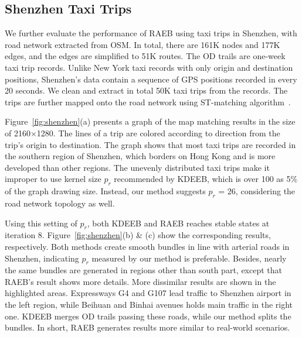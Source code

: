 \subsection{Shenzhen Taxi Trips}
\label{ssec:study3}

We further evaluate the performance of RAEB using taxi trips in Shenzhen, with road network extracted from OSM.
In total, there are 161K nodes and 177K edges, and the edges are simplified to 51K routes.
The OD trails are one-week taxi trip records.
Unlike New York taxi records with only origin and destination positions, Shenzhen's data contain a sequence of GPS positions recorded in every 20 seconds.
We clean and extract in total 50K taxi trips from the records.
The trips are further mapped onto the road network using ST-matching algorithm~\cite{lou_2009_map}.

Figure~\ref{fig:shenzhen}(a) presents a graph of the map matching results in the size of 2160$\times$1280.
The lines of a trip are colored according to direction from the trip's origin to destination.
The graph shows that most taxi trips are recorded in the southern region of Shenzhen, which borders on Hong Kong and is more developed than other regions.
The unevenly distributed taxi trips make it improper to use kernel size $p_r$ recommended by KDEEB, which is over 100 as 5\% of the graph drawing size.
Instead, our method suggests $p_r$ = 26, considering the road network topology as well.

Using this setting of $p_r$, both KDEEB and RAEB reaches stable states at iteration 8.
Figure~\ref{fig:shenzhen}(b) \& (c) show the corresponding results, respectively.
Both methods create smooth bundles in line with arterial roads in Shenzhen, indicating $p_r$ measured by our method is preferable.
Besides, nearly the same bundles are generated in regions other than south part, except that RAEB's result shows more details.
More dissimilar results are shown in the highlighted areas.
Expressways G4 and G107 lead traffic to Shenzhen airport in the left region, while Beihuan and Binhai avenues holds main traffic in the right one.
KDEEB merges OD trails passing these roads, while our method splits the bundles.
In short, RAEB generates results more similar to real-world scenarios.